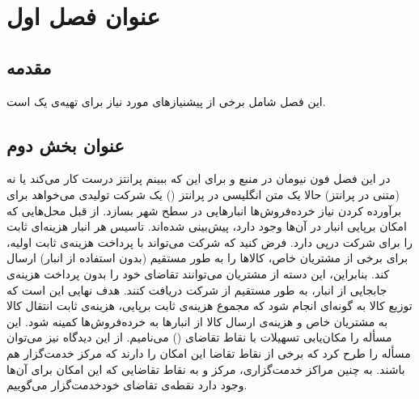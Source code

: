 \chapter{عنوان فصل اول }
\section{مقدمه}
این فصل
 شامل برخی از پیشنیازهای  مورد نیاز برای تهیه‌ی یک   است.
\section{عنوان بخش دوم}
در این فصل    فون نیومان 
در منبع   \cite{nemhauser1988integer} و \cite{mon97}
برای این که ببینم پرانتز درست کار می‌کند یا نه (متنی در پرانتز) حالا یک متن انگلیسی در پرانتز ()
یک شرکت   تولیدی می‌خواهد برای برآورده کردن نیاز خرده‌فروش‌ها انبارهایی در سطح شهر بسازد. از قبل محل‌هایی که امکان برپایی انبار در آن‌ها وجود دارد، پیش‌بینی شده‌اند. تاسیس هر انبار هزینه‌‌ای ثابت را برای شرکت درپی دارد. فرض کنید که شرکت می‌تواند با پرداخت هزینه‌ی ثابت اولیه، برای برخی از مشتریان خاص، کالاها را به طور مستقیم (بدون استفاده از انبار) ارسال کند. بنابراین، این دسته از مشتریان می‌توانند تقاضای خود را  بدون  پرداخت هزینه‌ی جابجایی از انبار، به طور مستقیم از شرکت دریافت کنند. هدف نهایی این است که توزیع کالا به گونه‌ای انجام شود که مجموع هزینه‌ی ثابت برپایی، هزینه‌ی ثابت انتقال کالا به مشتریان خاص و هزینه‌ی ارسال کالا از انبارها به خرده‌فروش‌ها کمینه شود.  این مسأله را مکان‌یابی تسهیلات با نقاط تقاضای    () می‌نامیم. از این دیدگاه نیز می‌توان مسأله را طرح کرد که برخی از نقاط تقاضا این امکان را دارند که مرکز خدمت‌گزار هم باشند. به چنین مراکز خدمت‌گزاری، مرکز   و به نقاط تقاضایی که این امکان برای آن‌ها وجود دارد  نقطه‌ی تقاضای خودخدمت‌گزار  می‌گوییم. 

